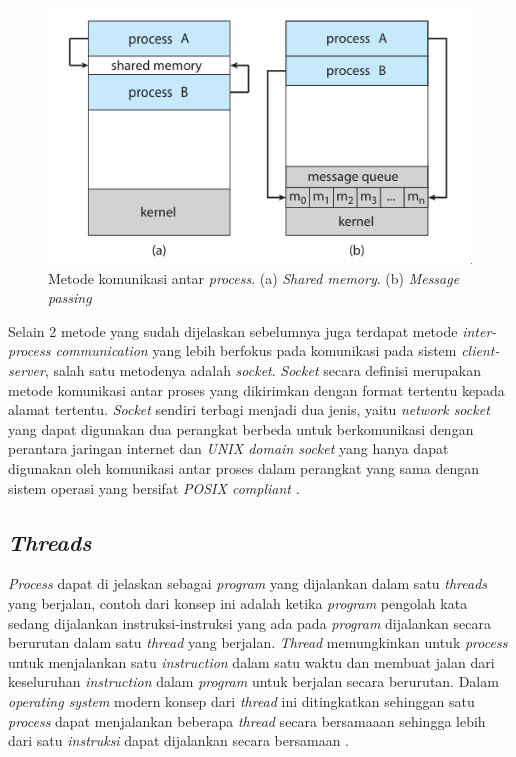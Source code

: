 \begin{figure}[H]
  \centering
	\includegraphics[keepaspectratio, width=12cm]{gambar/ipc_models.png}
  \caption{Metode komunikasi antar \emph{process}. (a) \emph{Shared memory}. (b) \emph{Message passing} \citep{operatingsystemconcept}}
	\label{gambar:ipc_models}
\end{figure}

Selain 2 metode yang sudah dijelaskan sebelumnya juga terdapat metode \emph{inter-process communication} yang lebih berfokus pada komunikasi pada sistem \emph{client-server}, salah satu metodenya adalah \emph{socket}. \emph{Socket} secara definisi merupakan metode komunikasi antar proses yang dikirimkan dengan format tertentu kepada alamat tertentu. \emph{Socket} sendiri terbagi menjadi dua jenis, yaitu \emph{network socket} yang dapat digunakan dua perangkat berbeda untuk berkomunikasi dengan perantara jaringan internet dan \emph{UNIX domain socket} yang hanya dapat digunakan oleh komunikasi antar proses dalam perangkat yang sama dengan sistem operasi yang bersifat \emph{POSIX compliant} \citep{operatingsystemconcept}.

\subsection{\emph{Threads}}

\emph{Process} dapat di jelaskan sebagai \emph{program} yang dijalankan dalam satu \emph{threads} yang berjalan, contoh dari konsep ini adalah ketika \emph{program} pengolah kata sedang dijalankan instruksi-instruksi yang ada pada \emph{program} dijalankan secara berurutan dalam satu \emph{thread} yang berjalan. \emph{Thread} memungkinkan untuk \emph{process} untuk menjalankan satu \emph{instruction} dalam satu waktu dan membuat jalan dari keseluruhan \emph{instruction} dalam \emph{program} untuk berjalan secara berurutan. Dalam \emph{operating system} modern konsep dari \emph{thread} ini ditingkatkan sehinggan satu \emph{process} dapat menjalankan beberapa \emph{thread} secara bersamaaan sehingga lebih dari satu \emph{instruksi} dapat dijalankan secara bersamaan \citep{operatingsystemconcept}. 

